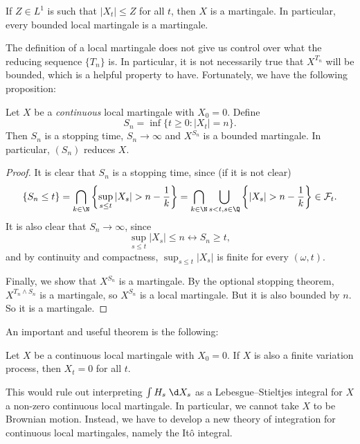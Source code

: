 \documentclass[a4paper]{article}
\begin{document}
\begin{cor}
  If $Z \in L^1$ is such that $|X_t| \leq Z$ for all $t$, then $X$ is a martingale. In particular, every bounded local martingale is a martingale.
\end{cor}

The definition of a local martingale does not give us control over what the reducing sequence $\{T_n\}$ is. In particular, it is not necessarily true that $X^{T_n}$ will be bounded, which is a helpful property to have. Fortunately, we have the following proposition:
\begin{prop}
  Let $X$ be a \emph{continuous} local martingale with $X_0 = 0$. Define
  \[
    S_n = \inf \{t \geq 0 : |X_t| = n \}.
  \]
  Then $S_n$ is a stopping time, $S_n \to \infty$ and $X^{S_n}$ is a bounded martingale. In particular, $(S_n)$ reduces $X$.
\end{prop}

\begin{proof}
  It is clear that $S_n$ is a stopping time, since (if it is not clear)
  \[
    \{S_n \leq t\} = \bigcap_{k \in \N} \left\{\sup_{s \leq t} |X_s| > n - \frac{1}{k}\right\} = \bigcap_{k \in \N} \bigcup_{s < t, s \in \Q} \left\{|X_s| > n - \frac{1}{k}\right\} \in \mathcal{F}_t.
  \]
  It is also clear that $S_n \to \infty$, since
  \[
    \sup_{s \leq t} |X_s| \leq n \leftrightarrow S_n \geq t,
  \]
  and by continuity and compactness, $\sup_{s \leq t} |X_s|$ is finite for every $(\omega, t)$.

  Finally, we show that $X^{S_n}$ is a martingale. By the optional stopping theorem, $X^{T_n \wedge S_n}$ is a martingale, so $X^{S_n}$ is a local martingale. But it is also bounded by $n$. So it is a martingale.
\end{proof}

An important and useful theorem is the following:
\begin{thm}
  Let $X$ be a continuous local martingale with $X_0 = 0$. If $X$ is also a finite variation process, then $X_t = 0$ for all $t$.
\end{thm}
This would rule out interpreting $\int H_s \;\d X_s$ as a Lebesgue--Stieltjes integral for $X$ a non-zero continuous local martingale. In particular, we cannot take $X$ to be Brownian motion. Instead, we have to develop a new theory of integration for continuous local martingales, namely the It\^o integral.
\end{document}
